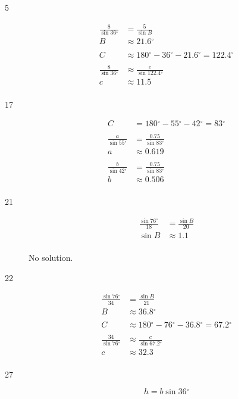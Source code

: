 \documentclass[fleqn,addpoints]{exam}
\newcommand{\degree}{\ensuremath{^\circ}}
\begin{document}
\begin{description}
\item[5] 
\begin{align*}
  \frac{8}{\sin 36 \degree} &= \frac{5}{\sin B} \\
  B &\approx 21.6 \degree \\
  \\
  C &\approx 180 \degree - 36 \degree - 21.6 \degree = 122.4 \degree \\
  \\
  \frac{8}{\sin 36 \degree} &\approx \frac{c}{\sin 122.4 \degree} \\
  c &\approx 11.5 \\
\end{align*}

\item[17] 
\begin{align*}
  C &= 180 \degree - 55 \degree - 42 \degree = 83 \degree \\
  \\
  \frac{a}{\sin 55 \degree} &= \frac{0.75}{\sin 83 \degree} \\
  a &\approx 0.619 \\
  \\
  \frac{b}{\sin 42 \degree} &= \frac{0.75}{\sin 83 \degree} \\
  b &\approx 0.506 \\
\end{align*}

\item[21] 
\begin{align*}
  \frac{\sin 76 \degree}{18} &= \frac{\sin B}{20} \\
  \sin B &\approx 1.1 \\
\end{align*}

No solution.

\item[22] 
\begin{align*}
  \frac{\sin 76 \degree}{34} &= \frac{\sin B}{21} \\
  B &\approx 36.8 \degree \\
  \\ 
  C &\approx 180 \degree - 76 \degree - 36.8 \degree = 67.2 \degree \\
  \\ 
  \frac{34}{\sin 76 \degree} &\approx \frac{c}{\sin 67.2 \degree} \\
  c &\approx 32.3 \\
\end{align*}

\item[27] 
\[
  h = b \sin 36 \degree
\]


\end{description}
\end{document}
